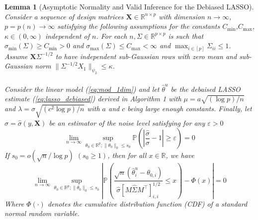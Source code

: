 \documentclass[10pt,a4paper]{amsart}
\newtheorem{lemma}{Lemma}
\begin{document}
\begin{lemma}[Asymptotic Normality and Valid Inference for the Debiased LASSO]
\label{lemma:lemma13}
    Consider a sequence of design matrices $\mathbf{X} \in \mathbb{R}^{n\times p}$ with dimension $n \to \infty$, $p = p(n)\to \infty$ satisfying the following assumptions for the constants $C_{\min}$,$C_{\max}$, $\kappa \in (0, \infty)$ independent of $n$. For each $n, \Sigma \in \mathbb{R}^{p\times p}$ is such that $\sigma_{\min}(\Sigma) \ge C_{\min} >0$ and $\sigma_{\max}(\Sigma) \le C_{\max} < \infty$ and $\max_{i\in [p]}\Sigma_{ii} \le 1$. Assume $\mathbf{X} \Sigma^{-1/2}$ to have independent sub-Gaussian rows with zero mean and sub-Gaussian norm $\|\Sigma^{-1/2}X_1\|_{\psi_2} \le \kappa$.
    \\
    \\
    Consider the linear model (\ref{eq:mod_1dim}) and let $\hat{\theta}^u$ be the debaised LASSO estimate (\ref{eq:lasso_debiased}) derived in Algorithm 1 with $\mu = a \sqrt{(\log p)/n}$ and $\lambda = \sigma \sqrt{(c^2 \log p)/n}$ with $a$ and $c$ being large enough constants. Finally, let $\hat{\sigma} = \hat{\sigma}(y,\mathbf{X})$ be an estimator of the noise level satisfying for any $\varepsilon>0$
    \begin{equation}
        \lim_{n \to \infty} \sup_{\theta_0 \in \mathbb{R}^p; \|\theta_0\|_0 \le s_0}\mathbb{P}\left(\left|\frac{\hat{\sigma}}{\sigma} - 1\right| \ge \varepsilon \right) = 0
    \end{equation}
    If $s_0 = o(\sqrt{n}/\log p)$ $(s_0 \ge 1)$, then for all $x \in \mathbb{R}$, we have
    \begin{equation}
        \lim_{n \to \infty} \sup_{\theta_0 \in \mathbb{R}^p; \|\theta_0\|_0 \le s_0}\left|\mathbb{P}\left(\frac{\sqrt{n}(\hat{\theta}^u_i - \theta_{0,i})}{\hat{\sigma} [M \hat{\Sigma}M^{\top}]_{i,i}^{1/2}}  \le x \right)- \Phi(x)\right| = 0
    \end{equation}
    Where $\Phi(\cdot)$ denotes the cumulative distribution function (CDF) of a standard normal random variable.
\end{lemma}
\end{document}
